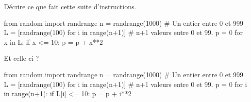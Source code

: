 Décrire ce que fait cette suite d'instructions. 
\begin{pyverbatim}
from random import randrange
n = randrange(1000) # Un entier entre 0 et 999
L = [randrange(100) for i in range(n+1)] # n+1 valeurs entre 0 et 99.
p = 0
for x in L:
    if x <= 10:
        p = p + x**2
\end{pyverbatim}
Et celle-ci ? 
\begin{pyverbatim}
from random import randrange
n = randrange(1000) # Un entier entre 0 et 999
L = [randrange(100) for i in range(n+1)] # n+1 valeurs entre 0 et 99.
p = 0
for i in range(n+1):
    if L[i] <= 10:
        p = p + i**2
\end{pyverbatim}
